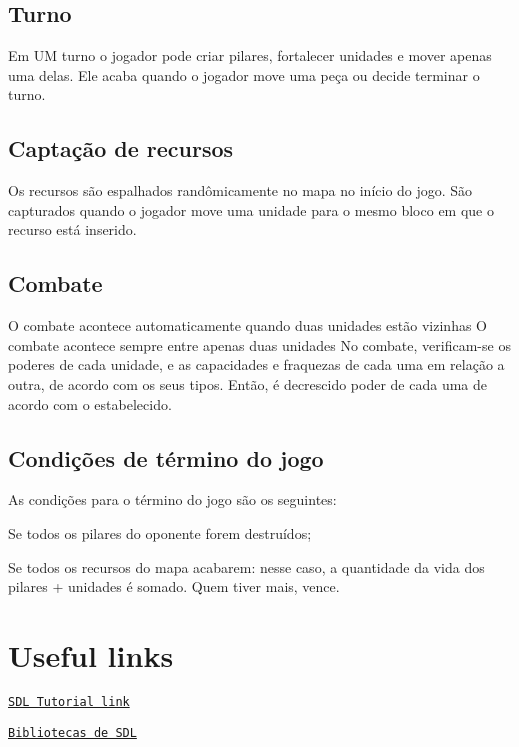 \subsection*{Turno}

Em UM turno o jogador pode criar pilares, fortalecer unidades e mover apenas uma delas. Ele acaba quando o jogador move uma peça ou decide terminar o turno.

\subsection*{Captação de recursos}

Os recursos são espalhados randômicamente no mapa no início do jogo. São capturados quando o jogador move uma unidade para o mesmo bloco em que o recurso está inserido.

\subsection*{Combate}

O combate acontece automaticamente quando duas unidades estão vizinhas O combate acontece sempre entre apenas duas unidades No combate, verificam-\/se os poderes de cada unidade, e as capacidades e fraquezas de cada uma em relação a outra, de acordo com os seus tipos. Então, é decrescido poder de cada uma de acordo com o estabelecido.

\subsection*{Condições de término do jogo}

As condições para o término do jogo são os seguintes\+:
\begin{DoxyItemize}
\item Se todos os pilares do oponente forem destruídos;
\item Se todos os recursos do mapa acabarem\+: nesse caso, a quantidade da vida dos pilares + unidades é somado. Quem tiver mais, vence.
\end{DoxyItemize}

\section*{Useful links}


\begin{DoxyItemize}
\item \href{http://lazyfoo.net/tutorials/SDL/}{\tt S\+DL Tutorial link}
\item \href{https://www.libsdl.org/release/SDL-1.2.15/docs/html/}{\tt Bibliotecas de S\+DL} 
\end{DoxyItemize}